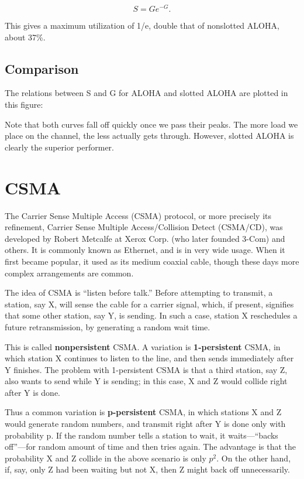 \documentclass[11pt]{article}
\begin{document}
\begin{equation}
S = G e^{-G}.
\end{equation}

This gives a maximum utilization of 1/e, double that of nonslotted
ALOHA, about 37\%.

\subsection{Comparison}

The relations between S and G for ALOHA and slotted ALOHA are plotted
in this figure:

\vspace{0.2in}
\par
{}
\par

Note that both curves fall off quickly once we pass their peaks.  The
more load we place on the channel, the less actually gets through.
However, slotted ALOHA is clearly the superior performer.

\section{CSMA}

The Carrier Sense Multiple Access (CSMA) protocol, or more precisely its
refinement, Carrier Sense Multiple Access/Collision Detect (CSMA/CD),
was developed by Robert Metcalfe at Xerox Corp. (who later founded
3-Com) and others.  It is commonly known as Ethernet, and is in very
wide usage.  When it first became popular, it used as its medium
coaxial cable, though these days more complex arrangements are common.

The idea of CSMA is ``listen before talk.''  Before attempting to
transmit, a station, say X, will sense the cable for a carrier signal,
which, if present, signifies that some other station, say Y, is sending.
In such a case, station X reschedules a future retransmission, by
generating a random wait time.

This is called {\bf nonpersistent} CSMA.  A variation is {\bf
1-persistent} CSMA, in which station X continues to listen to the line,
and then sends immediately after Y finishes.  The problem with
1-persistent CSMA is that a third station, say Z, also wants to send
while Y is sending; in this case, X and Z would collide right after Y is
done.  

Thus a common variation is {\bf p-persistent} CSMA, in which stations X
and Z would generate random numbers, and transmit right after Y is done
only with probability p.  If the random number tells a station to wait,
it waits---``backs off''---for random amount of time and then tries again.
The advantage is that the probability X and Z collide in the above
scenario is only $p^2$.  On the other hand, if, say, only Z had been
waiting but not X, then Z might back off unnecessarily.
\end{document}
